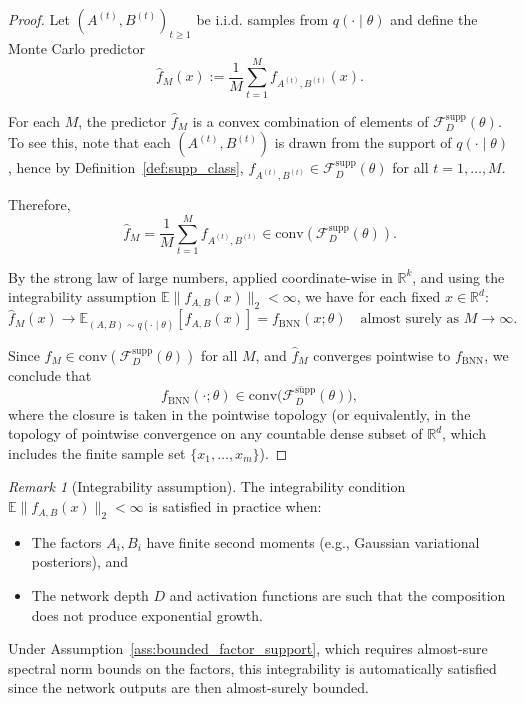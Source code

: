 \documentclass{article}
\theoremstyle{plain}
\theoremstyle{definition}
\theoremstyle{remark}
\newtheorem{remark}[theorem]{Remark}
\begin{document}
\begin{proof}
Let $(A^{(t)},B^{(t)})_{t\ge 1}$ be i.i.d. samples from $q(\cdot\mid\theta)$ and define the Monte Carlo predictor
\[
\hat{f}_M(x) := \frac{1}{M}\sum_{t=1}^M f_{A^{(t)},B^{(t)}}(x).
\]

For each $M$, the predictor $\hat{f}_M$ is a convex combination of elements of $\mathcal{F}^{\mathrm{supp}}_D(\theta)$. To see this, note that each $(A^{(t)},B^{(t)})$ is drawn from the support of $q(\cdot\mid\theta)$, hence by Definition~\ref{def:supp_class}, $f_{A^{(t)},B^{(t)}}\in\mathcal{F}^{\mathrm{supp}}_D(\theta)$ for all $t=1,\ldots,M$.

Therefore,
\[
\hat{f}_M = \frac{1}{M}\sum_{t=1}^M f_{A^{(t)},B^{(t)}} \in \mathrm{conv}(\mathcal{F}^{\mathrm{supp}}_D(\theta)).
\]

By the strong law of large numbers, applied coordinate-wise in $\mathbb{R}^k$, and using the integrability assumption $\mathbb{E}\|f_{A,B}(x)\|_2<\infty$, we have for each fixed $x\in\mathbb{R}^d$:
\[
\hat{f}_M(x)\to \mathbb{E}_{(A,B)\sim q(\cdot\mid\theta)}[f_{A,B}(x)]=f_{\mathrm{BNN}}(x;\theta) \quad \text{almost surely as } M\to\infty.
\]

Since $\hat{f}_M\in\mathrm{conv}(\mathcal{F}^{\mathrm{supp}}_D(\theta))$ for all $M$, and $\hat{f}_M$ converges pointwise to $f_{\mathrm{BNN}}$, we conclude that
\[
f_{\mathrm{BNN}}(\cdot;\theta) \in \overline{\mathrm{conv}\big(\mathcal{F}^{\mathrm{supp}}_D(\theta)\big)},
\]
where the closure is taken in the pointwise topology (or equivalently, in the topology of pointwise convergence on any countable dense subset of $\mathbb{R}^d$, which includes the finite sample set $\{x_1,\ldots,x_m\}$).
\end{proof}

\begin{remark}[Integrability assumption]
The integrability condition $\mathbb{E}\|f_{A,B}(x)\|_2<\infty$ is satisfied in practice when:
\begin{itemize}
    \item The factors $A_i, B_i$ have finite second moments (e.g., Gaussian variational posteriors), and
    \item The network depth $D$ and activation functions are such that the composition does not produce exponential growth.
\end{itemize}
Under Assumption~\ref{ass:bounded_factor_support}, which requires almost-sure spectral norm bounds on the factors, this integrability is automatically satisfied since the network outputs are then almost-surely bounded.
\end{remark}
\end{document}

